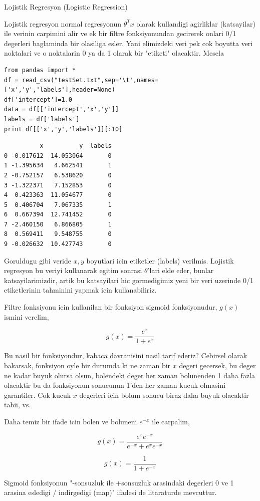 \documentclass[12pt,fleqn]{article}\usepackage{../common}
\begin{document}
Lojistik Regresyon (Logistic Regression)

Lojistik regresyon normal regresyonun $\theta^T x$ olarak kullandigi agirliklar
(katsayilar) ile verinin carpimini alir ve ek bir filtre fonksiyonundan
gecirerek onlari 0/1 degerleri baglaminda bir olasiliga esler. Yani
elimizdeki veri pek cok boyutta veri noktalari ve o noktalarin 0 ya da 1
olarak bir "etiketi" olacaktir. Mesela

\begin{verbatim}
from pandas import *
df = read_csv("testSet.txt",sep='\t',names=['x','y','labels'],header=None)
df['intercept']=1.0
data = df[['intercept','x','y']]
labels = df['labels']
print df[['x','y','labels']][:10]
\end{verbatim}

\begin{verbatim}
          x          y  labels
0 -0.017612  14.053064       0
1 -1.395634   4.662541       1
2 -0.752157   6.538620       0
3 -1.322371   7.152853       0
4  0.423363  11.054677       0
5  0.406704   7.067335       1
6  0.667394  12.741452       0
7 -2.460150   6.866805       1
8  0.569411   9.548755       0
9 -0.026632  10.427743       0
\end{verbatim}


Goruldugu gibi veride $x,y$ boyutlari icin etiketler (labels)
verilmis. Lojistik regresyon bu veriyi kullanarak egitim sonrasi
$\theta$'lari elde eder, bunlar katsayilarimizdir, artik bu
katsayilari hic gormedigimiz yeni bir veri uzerinde 0/1 etiketlerinin
tahminini yapmak icin kullanabiliriz.

Filtre fonksiyonu icin kullanilan bir fonksiyon sigmoid fonksiyonudur,
$g(x)$ ismini verelim,

$$ g(x) = \frac{e^{x}}{1+e^{x}} $$

Bu nasil bir fonksiyondur, kabaca davranisini nasil tarif ederiz?
Cebirsel olarak bakarsak, fonksiyon oyle bir durumda ki ne zaman bir
$x$ degeri gecersek, bu deger ne kadar buyuk olursa olsun, bolendeki
deger her zaman bolunenden 1 daha fazla olacaktir bu da fonksiyonun
sonucunun 1'den her zaman kucuk olmasini garantiler. Cok kucuk $x$
degerleri icin bolum sonucu biraz daha buyuk olacaktir tabii, vs.

Daha temiz bir ifade icin bolen ve boluneni $e^{-x}$ ile carpalim,

$$ g(x) = \frac{e^{x}e^{-x}}{e^{-x}+e^{x}e^{-x}} $$

$$ g(x) = \frac{1}{1+e^{-x}} $$

Sigmoid fonksiyonun "-sonsuzluk ile +sonsuzluk arasindaki degerleri 0
ve 1 arasina esledigi / indirgedigi (map)" ifadesi de litaraturde
mevcuttur.
\end{document}
